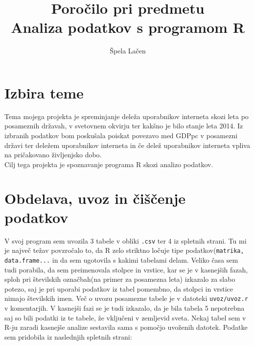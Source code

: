 \documentclass[11pt,a4paper]{article}
\begin{document}
\author{Špela Lačen}
\title{Poročilo pri predmetu \\
Analiza podatkov s programom R}
\maketitle

\section{Izbira teme}

Tema mojega projekta je spreminjanje deleža uporabnikov interneta skozi leta po posameznih državah, v svetovnem okvirju ter kakšno je bilo stanje leta 2014. Iz izbranih podatkov bom poskušala poiskat povezavo med  GDPpc v posamezni državi ter deležem uporabnikov interneta in če delež uporabnikov interneta vpliva na pričakovano življenjsko dobo.
\\ Cilj tega projekta je spoznavanje programa R skozi analizo podatkov.



\section{Obdelava, uvoz in čiščenje podatkov}

V svoj program sem uvozila 3 tabele  v obliki \verb|.csv| ter 4 iz spletnih strani. Tu mi je največ težav povzročalo to, da R zelo striktno ločuje tipe podatkov\-(\verb|matrika, data.frame...| in da sem ugotovila s kakimi tabelami delam. Veliko časa sem tudi porabila, da sem preimenovala stolpce in vrstice, kar se je v kasnejših fazah, sploh pri številskih označbah(na primer za posamezna leta) izkazalo za slabo potezo, saj je pri uporabi podatkov iz tabel pomembno, da stolpci in vrstice nimajo številskih imen. Več o uvozu posamezne tabele je v datoteki \verb|uvoz/uvoz.r| v komentarjih. V kasnejši fazi se je tudi izkazalo, da je bila tabela 5 nepotrebna saj so bili podatki iz te tabele, že vključeni v zemljevid sveta.
\-Nekaj tabel sem v R-ju zaradi kasnejše analize sestavila sama s pomočjo uvoženih datotek.
\-
Podatke sem pridobila iz naslednjih spletnih strani:
\begin{itemize} 
\item \url{http://data.worldbank.org/indicator/IT.NET.USER.P2}
\item \url{http://www.internetlivestats.com/internet-users-by-country/}
\item \url{http://www.internetlivestats.com/internet-users/#trend}
\item \url{http://www.internetworldstats.com/stats.htm}
\item \url{http://databank.worldbank.org/data/views/reports/tableview.aspx?isshared=true
\item \url{http://www.nationmaster.com/country-info/stats/Health/Life-expectancy-at-birth%2C-total/Years#map}

\end {itemize}
\end{document}
